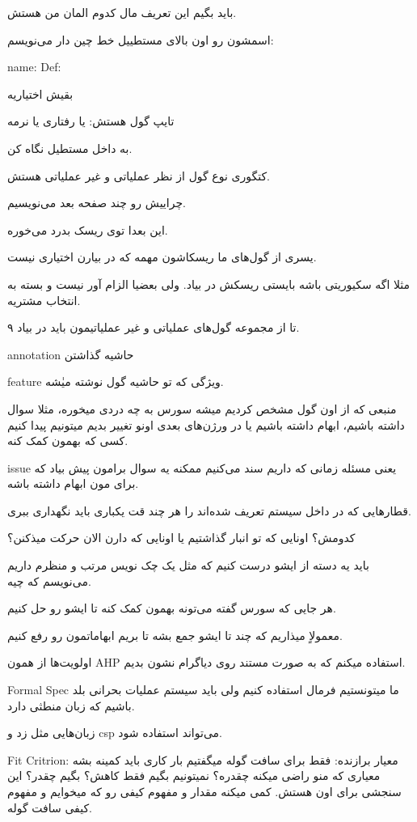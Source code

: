 باید بگیم این تعریف مال کدوم المان من هستش.

اسمشون رو اون بالای مستطییل خط چین دار می‌نویسم:

name:
Def:

بقیش اختیاریه

تایپ گول هستش: یا رفتاری یا نرمه

به داخل مستطیل نگاه کن.

کتگوری نوع گول از نظر عملیاتی و غیر عملیاتی هستش.

چراییش رو چند صفحه بعد می‌نویسیم.

این بعدا توی ریسک بدرد می‌خوره.

یسری از گول‌های ما ریسکاشون مهمه که در بیارن اختیاری نیست.

مثلا اگه سکیوریتی باشه بایستی ریسکش در بیاد. ولی بعضیا الزام آور نیست و بسته به
انتخاب مشتریه.

۹ تا از مجموعه گول‌های عملیاتی و غیر عملیاتیمون باید در بیاد.

annotation حاشیه گذاشتن

feature ويژگی که تو حاشیه گول نوشته میٰشه.

منبعی که از اون گول مشخص کردیم میشه سورس
به چه دردی میخوره، مثلا سوال داشته باشیم، ابهام داشته باشیم یا در ورژن‌های بعدی
اونو تغییر بدیم میتونیم پیدا کنیم کسی که بهمون کمک کنه.

issue یعنی مسئله زمانی که داریم سند می‌کنیم ممکنه یه سوال برامون پیش بیاد که
برای مون ابهام داشته باشه.

قطار‌هایی که در داخل سیستم تعریف شده‌اند را هر چند قت یکباری باید نگهداری ببری.

کدومش؟ اونایی که تو انبار گذاشتیم یا اونایی که دارن الان حرکت میذکنن؟

باید یه دسته از ایشو درست کنیم که مثل یک چک نویس مرتب و منظرم داریم می‌نویسم که
چیه.

هر جایی که سورس گفته می‌تونه بهمون کمک کنه تا ایشو رو حل کنیم.

معمولاٍ میذاریم که چند تا ایشو جمع بشه تا بریم ابهاماتمون رو رفع کنیم.

اولویت‌ها از همون AHP استفاده میکنم که به صورت مستند روی دیاگرام نشون بدیم.

Formal Spec ما میتونستیم فرمال استفاده کنیم ولی باید سیستم عملیات بحرانی بلد
باشیم که زبان منطثی دارد.

زبان‌هایی مثل زد و csp می‌تواند استفاده شود.

Fit Critrion: معیار برازنده: فقط برای سافت گوله
میگفتیم بار کاری باید کمینه بشه معیاری که منو راضی میکنه چقدره؟ نمیتونیم بگیم
فقط کاهش؟ بگیم چقدر؟ این سنجشی برای اون هستش. کمی میکنه مقدار و مفهوم کیفی رو
که
میخوایم و مفهوم کیفی سافت گوله.

